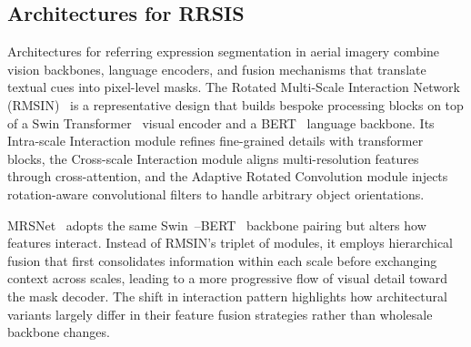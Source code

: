 \documentclass[journal]{IEEEtran}
\begin{document}
\subsection{Architectures for RRSIS}

Architectures for referring expression segmentation in aerial imagery combine vision backbones, language encoders, and fusion mechanisms that translate textual cues into pixel-level masks. The Rotated Multi-Scale Interaction Network (RMSIN)~\cite{liu2024rotated} is a representative design that builds bespoke processing blocks on top of a Swin Transformer~\cite{swin} visual encoder and a BERT~\cite{bert} language backbone. Its Intra-scale Interaction module refines fine-grained details with transformer~\cite{transformer} blocks, the Cross-scale Interaction module aligns multi-resolution features through cross-attention, and the Adaptive Rotated Convolution module injects rotation-aware convolutional filters to handle arbitrary object orientations.

MRSNet~\cite{yang2024large} adopts the same Swin~\cite{swin}--BERT~\cite{bert} backbone pairing but alters how features interact. Instead of RMSIN's triplet of modules, it employs hierarchical fusion that first consolidates information within each scale before exchanging context across scales, leading to a more progressive flow of visual detail toward the mask decoder. The shift in interaction pattern highlights how architectural variants largely differ in their feature fusion strategies rather than wholesale backbone changes.
\end{document}
